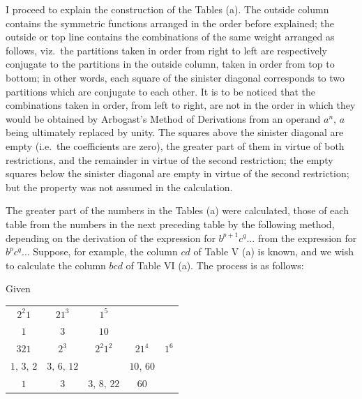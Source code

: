 \documentclass[11pt]{article}
\begin{document}
\medskip

I proceed to explain the construction of the Tables (a). The outside column contains the symmetric functions arranged in the order before explained; the outside or top line contains the combinations of the same weight arranged as follows, viz.\ the partitions taken in order from right to left are respectively conjugate to the partitions in the outside column, taken in order from top to bottom; in other words, each square of the sinister diagonal corresponds to two partitions which are conjugate to each other. It is to be noticed that the combinations taken in order, from left to right, are not in the order in which they would be obtained by Arbogast's Method of Derivations from an operand $a^n$, $a$ being ultimately replaced by unity. The squares above the sinister diagonal are empty (i.e.\ the coefficients are zero), the greater part of them in virtue of both restrictions, and the remainder in virtue of the second restriction; the empty squares below the sinister diagonal are empty in virtue of the second restriction; but the property was not assumed in the calculation.

\medskip

The greater part of the numbers in the Tables (a) were calculated, those of each table from the numbers in the next preceding table by the following method, depending on the derivation of the expression for $b^{p+1} c^q\ldots$ from the expression for $b^p c^q\ldots$ Suppose, for example, the column $cd$ of Table V (a) is known, and we wish to calculate the column $bcd$ of Table VI (a). The process is as follows:

\medskip

\noindent Given
\begin{center}
\begin{tabular}{ccccc}
$2^2 1$ & $21^3$ & $1^5$ & & \\
$1$     & $3$    & $10$  & & \\
\hline
$321$       & $2^3$       & $2^2 1^2$ & $21^4$    & $1^6$ \\
$1,\,3,\,2$ & $3,\,6,\,12$&           & $10,\,60$ & \\
\hline
$1$ & $3$ & $3,\,8,\,22$ & $60$ & \\
\end{tabular}
\end{center}

\medskip
\end{document}
